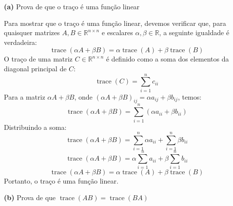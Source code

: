 \begin{resolution}
  {\bf (a)}  Prova de que o traço é uma função linear

  Para mostrar que o traço é uma função linear, devemos verificar que, para quaisquer matrizes \( A, B \in \mathbb{R}^{n \times n} \) e escalares \( \alpha, \beta \in \mathbb{R} \), a seguinte igualdade é verdadeira:
  \begin{equation}
    \operatorname{trace}(\alpha A + \beta B) = \alpha \operatorname{trace}(A) + \beta \operatorname{trace}(B)
  \end{equation}
  O traço de uma matriz \( C \in \mathbb{R}^{n \times n} \) é definido como a soma dos elementos da diagonal principal de \( C \):
  \begin{equation}
    \operatorname{trace}(C) = \sum_{i=1}^n c_{ii}
  \end{equation}
  Para a matriz \( \alpha A + \beta B \), onde \( (\alpha A + \beta B)_{ij} = \alpha a_{ij} + \beta b_{ij} \), temos:
  \begin{equation}
    \operatorname{trace}(\alpha A + \beta B) = \sum_{i=1}^n (\alpha a_{ii} + \beta b_{ii})
  \end{equation}
  Distribuindo a soma:
  \begin{equation}
    \operatorname{trace}(\alpha A + \beta B) = \sum_{i=1}^n \alpha a_{ii} + \sum_{i=1}^n \beta b_{ii}
  \end{equation}
  \begin{equation}
    \operatorname{trace}(\alpha A + \beta B) = \alpha \sum_{i=1}^n a_{ii} + \beta \sum_{i=1}^n b_{ii}
  \end{equation}
  \begin{equation}
    \operatorname{trace}(\alpha A + \beta B) = \alpha \operatorname{trace}(A) + \beta \operatorname{trace}(B)
  \end{equation}
  Portanto, o traço é uma função linear.

    {\bf (b)} Prova de que \( \operatorname{trace}(AB) = \operatorname{trace}(BA) \)


\end{resolution}
